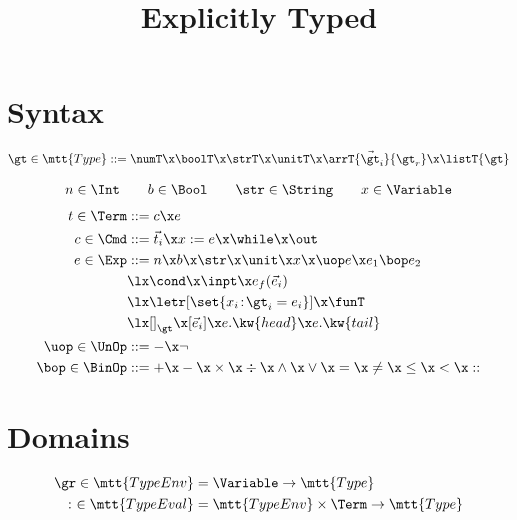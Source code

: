 \documentclass[nocopyrightspace,onecolumn]{sigplanconf}
\begin{document}
\title{Explicitly Typed \miniJS}
\authorinfo{}{}{}
\date{}
\maketitle

\section{Syntax}

\vsp

\begin{mdframed}
  \begin{gather*}
    \gt \in \mtt{Type} ::= \numT \x \boolT \x \strT \x \unitT \x
    \arrT{\vec{\gt}_i}{\gt_r} \x \listT{\gt}    
  \end{gather*}
  \nvsp
\end{mdframed}

\vsp

\begin{mdframed}
  \begin{gather*}
    n \in \Int \qquad b \in \Bool \qquad \str \in \String \qquad x
    \in \Variable
  \end{gather*}
  \begin{align*}
    t \in \Term &::= c \x e
    \\
    c \in \Cmd &::= \vec{t}_i \x x := e \x \while \x \out
    \\
    e \in \Exp &::= n \x b \x \str \x \unit \x x \x \uop e
    \x e_1 \bop e_2\\
    &\lx \cond \x \inpt \x e_f(\vec{e}_i)\\
    &\lx \letr[\set{x_i\!:\!\gt_i = e_i}] \x \funT\\
    &\lx []_\gt \x [\vec{e}_i] \x e.\kw{head} \x e.\kw{tail}
    \\
    \uop \in \UnOp &::= - \x \neg
    \\
    \bop \in \BinOp &::= + \x - \x \times \x \div \x \land \x
    \lor \x = \x \neq \x \leq \x < \x ::
  \end{align*}
\end{mdframed}

\section{Domains}

\begin{align*}
  \gr \in \mtt{TypeEnv} &= \Variable \to \mtt{Type}
  \\
  :\ \in \mtt{TypeEval} &= \mtt{TypeEnv} \times \Term \to \mtt{Type}
\end{align*}
\end{document}
